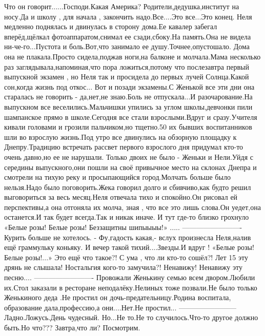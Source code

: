 Что он говорит......Господи.Какая Америка? Родители,дедушка,институт на носу.Да и школу , для начала ,  закончить надо.Все....Это все...Это конец.
Неля медленно поднялась и двинулась в сторону дома.Ее кавалер забегал вперёд,щёлкал фотоаппаратом,снимал ее сзади,сбоку.На память.Она не видела ни-че-го...Пустота и боль.Вот,что занимало ее душу.Точнее,опустошало.
Дома она не плакала.Просто сидела,поджав ноги,на балконе и молчала.Мама несколько раз заглядывала,напоминая,что пора ложиться,потому что послезавтра первый выпускной экзамен , но Неля так и просидела до первых лучей Солнца.Какой сон,когда жизнь под откос...
Вот и позади экзамены.С Женькой все эти дни она старалась не говорить - да,нет,не знаю.Боль не отпускала...И разочарование.На выпускном все веселились.Мальчишки упились за углом школы,девчонки пили шампанское прямо в школе.Сегодня все стали взрослыми.Вдруг и сразу.Учителя кивали головами и грозили пальчиком,но тщетно.50 их бывших воспитанников шли во взрослую жизнь.Под утро все двинулись на обзорную площадку к Днепру.Традицию встречать рассвет первого взрослого дня придумал кто-то очень давно,но ее не нарушали.
Только двоих не было - Женьки и Нели.Уйдя с середины выпускного,они пошли на своё привычное место на склонах Днепра и смотрели на тихую реку и просыпающийся город.Молчать больше было нельзя.Надо было поговорить.Жека говорил долго и сбивчиво,как будто решил выговориться за весь месяц.Неля отвечала тихо и спокойно.Он рисовал ей перспективы,а она отгоняла их молча, зная , что все это лишь слова.Он уедет,она останется.И так будет всегда.Так и никак иначе.
И тут где-то близко грохнуло «Белые розы! Белые розы! Беззащитны шипыыыы!» .....
————————-
Курить больше не хотелось.
- Фу,гадость какая,- вслух произнесла Неля,налив ещё граммульку коньяку.
И вечер такой тихий....Звезды.И вдруг !
«Белые розы! Белые розы!...»
Это ещё что такое?! С ума , что ли кто-то сошёл?! Лет 15 эту дрянь не слышала! Ностальгия кого-то замучила?! Ненавижу! Ненавижу эту песню....
————————-
Провожали Женькину семью всем двором.Любили их.Стол заказали в ресторане неподалёку.Нелиных тоже позвали.Не было только Женькиного деда .Не простил он дочь-предательницу.Родина воспитала, образование дала,профессию,а они....Нет.Не простил...
————————
Ладно.Ложусь.День чудесный. Но...Не то.Не то случилось.Что-то другое должно быть.Но что??? Завтра,что ли? Посмотрим.
